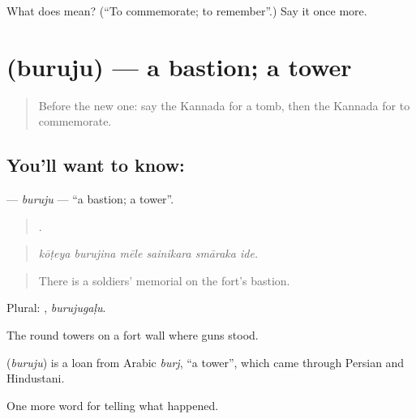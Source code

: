 \begin{tcolorbox}[breakable,colback=teal!4,colframe=teal!35!black,title={Before you move on}]
What does  mean? (\textquotedblleft{}To commemorate; to remember\textquotedblright{}.) Say it once more.
\end{tcolorbox}
\section[\texorpdfstring{\kn{ಬುರುಜು} (buruju)}{ಬುರುಜು (buruju)}]{ (buruju) — a bastion; a tower}

\label{lesson:KA-C361-buruju}



\begin{quote}
Before the new one: say the Kannada for a tomb, then the Kannada for to commemorate.
\end{quote}

\subsection*{You'll want to know: }
\textbf{} — \emph{buruju} — \textquotedblleft{}a bastion; a tower\textquotedblright{}.

\begin{quote}
     .
\end{quote}

\begin{quote}
\emph{kōṭeya burujina mēle sainikara smāraka ide.}
\end{quote}

\begin{quote}
There is a soldiers' memorial on the fort's bastion.
\end{quote}

Plural: , \emph{burujugaḷu}.

The round towers on a fort wall where guns stood.

\begin{cousinweb}
\textbf{} (\emph{buruju}) is a loan from Arabic \emph{burj}, \textquotedblleft{}a tower\textquotedblright{}, which came through Persian and Hindustani.
\end{cousinweb}

\begin{grammarlens}[title={What you've built}]
One more word for telling what happened.
\end{grammarlens}

